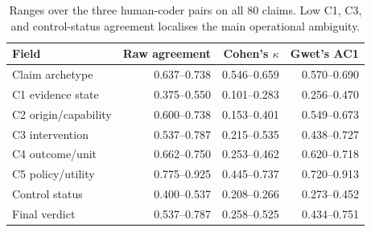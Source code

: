 \begin{table}[t]
\centering
\small
\setlength{\tabcolsep}{6pt}
\begin{tabular}{lrrr}
\toprule
\textbf{Field} & \textbf{Raw agreement} &
\textbf{Cohen's $\kappa$} & \textbf{Gwet's AC1} \\
\midrule
Claim archetype & 0.637--0.738 & 0.546--0.659 & 0.570--0.690 \\
C1 evidence state & 0.375--0.550 & 0.101--0.283 & 0.256--0.470 \\
C2 origin/capability & 0.600--0.738 & 0.153--0.401 & 0.549--0.673 \\
C3 intervention & 0.537--0.787 & 0.215--0.535 & 0.438--0.727 \\
C4 outcome/unit & 0.662--0.750 & 0.253--0.462 & 0.620--0.718 \\
C5 policy/utility & 0.775--0.925 & 0.445--0.737 & 0.720--0.913 \\
Control status & 0.400--0.537 & 0.208--0.266 & 0.273--0.452 \\
Final verdict & 0.537--0.787 & 0.258--0.525 & 0.434--0.751 \\
\bottomrule
\end{tabular}
\caption{Ranges over the three human-coder pairs on all 80 claims. Low C1,
C3, and control-status agreement localises the main operational ambiguity.}
\label{tab:human-field-agreement}
\end{table}

